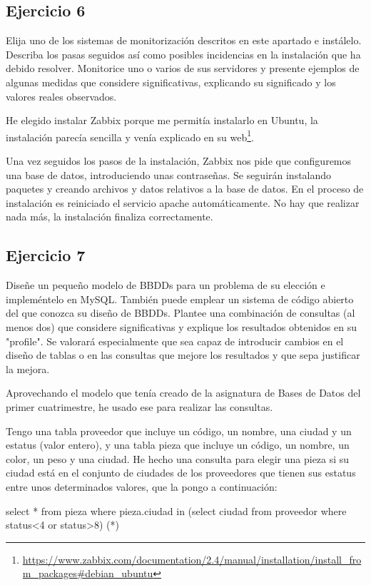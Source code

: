 \documentclass[a4paper, 11pt]{article} %
\begin{document}
\subsection{Ejercicio 6}
Elija uno de los sistemas de monitorización descritos en este apartado e instálelo. Describa los pasas seguidos así como posibles incidencias en la instalación que ha debido resolver. Monitorice uno o varios de sus servidores y presente ejemplos de algunas medidas que considere significativas, explicando su significado y los valores reales observados.

He elegido instalar Zabbix porque me permitía instalarlo en Ubuntu, la instalación parecía sencilla y venía explicado en su web\footnote{\url{https://www.zabbix.com/documentation/2.4/manual/installation/install\_from\_packages\#debian\_ubuntu}}. 

Una vez seguidos los pasos de la instalación, Zabbix nos pide que configuremos una base de datos, introduciendo unas contraseñas. Se seguirán instalando paquetes y creando archivos y datos relativos a la base de datos. En el proceso de instalación es reiniciado el servicio apache automáticamente. No hay que realizar nada más, la instalación finaliza correctamente. 


\subsection{Ejercicio 7}
Diseñe un pequeño modelo de BBDDs para un problema de su elección e impleméntelo en MySQL. También puede emplear un sistema de código abierto del que conozca su diseño de BBDDs. Plantee una combinación de consultas (al menos dos) que considere significativas y explique los resultados obtenidos en su "profile". Se valorará especialmente que sea capaz de introducir cambios en el diseño de tablas o en las consultas que mejore los resultados y que sepa justificar la mejora. 

Aprovechando el modelo que tenía creado de la asignatura de Bases de Datos del primer cuatrimestre, he usado ese para realizar las consultas. 

Tengo una tabla proveedor que incluye un código, un nombre, una ciudad y un estatus (valor entero), y una tabla pieza que incluye un código, un nombre, un color, un peso y una ciudad. He hecho una consulta para elegir una pieza si su ciudad está en el conjunto de ciudades de los proveedores que tienen sus estatus entre unos determinados valores, que la pongo a continuación: 

select * from pieza where pieza.ciudad in (select ciudad from proveedor where status<4 or status>8) (*)
\end{document}
